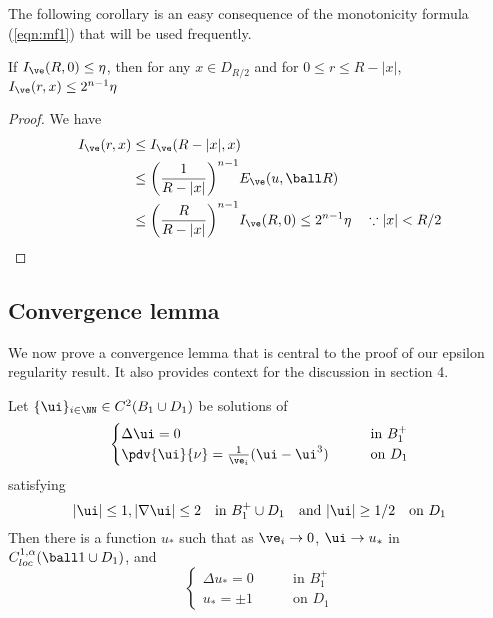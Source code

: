 The following corollary is an easy consequence of the monotonicity formula (\ref{eqn:mf1}) that will be used frequently.

\begin{coro}
If $I_{\ve}(R,0) \leq \eta$, then for any $x \in D_{R/2}$ and for $0\leq r \leq R-|x|$,  $I_\ve (r,x) \leq 2^{n-1} \eta$
\end{coro}
\begin{proof}
  We have
\begin{equation}\label{eqn:mflemma}
    \begin{split}
                   I_\ve (r,x) &\leq I_\ve (R-|x|,x) \\
                    &\leq \bigg(\frac{1}{R-|x|}\bigg)^{n-1} E_{\ve}(u,\ball R) \\
                    &\leq \bigg(\frac{R}{R-|x|}\bigg)^{n-1} I_\ve (R,0) \leq 2^{n-1} \eta \quad \because |x|<R/2
    \end{split}
\end{equation}  
\end{proof}






\subsection{Convergence lemma}We now prove a convergence lemma that is central to the proof of our epsilon regularity result. It also provides context for the discussion in section 4.

\begin{lemm}\label{lem:conv}
    Let $\{\ui\}_{i \in \NN } \in C^2(B_1\cup D_1)$ be solutions of 
    \begin{equation} \label{eqn:conveqn}
        \begin{cases}
            \Delta \ui = 0 \qquad &\text{in } B_1^+ \\
            \pdv{\ui}{\nu} = \frac{1}{\ve_i}(\ui-\ui^3) \qquad  &\text{on  } D_1
        \end{cases}
    \end{equation}
satisfying
    \begin{equation} \label{eqn:bdry}
       |\ui| \leq 1, |\nabla \ui| \leq 2 \quad \text{in } B_1^+ \cup D_1 \quad \text{and }|\ui|\geq 1/2 \quad \text{on } D_1 
    \end{equation}
Then there is a function $u_{*}$ such that as $\ve_i \to 0$, $\ui \to u_{*}$ in $C^{1,\alpha}_{loc}(\ball 1 \cup D_1)$, and
\begin{equation}
        \begin{cases}
            \Delta u_{*} = 0 \qquad &\text{in } B_1^+ \\
            u_{*} = \pm 1 \qquad  &\text{on  } D_1
        \end{cases}
    \end{equation}
\end{lemm}

